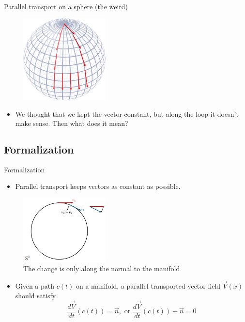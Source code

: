 \documentclass{beamer}
\begin{document}
\begin{frame}{Parallel transport on a sphere (the weird)}
\begin{figure}[h!]
    \includegraphics[width=0.4\textwidth]{images/PT_sphere.png}
\end{figure}  
\begin{itemize}
    \item We thought that we kept the vector constant, but along the loop it doesn't make sense. Then what does it mean?
\end{itemize}  
\end{frame}

\subsection{Formalization}
\begin{frame}{Formalization}
    \begin{itemize}
        \item Parallel transport keeps vectors as constant as possible.
    \end{itemize}
    \begin{figure}[h!]
        \includegraphics[width=0.4\textwidth]{images/only_normal.png}
        \caption{The change is only along the normal to the manifold}
    \end{figure}
    \begin{itemize}
        \item Given a path $c(t)$ on a manifold, a parallel transported vector field $\vec{V}(x)$ should satisfy 
        \begin{equation}
            \frac{d\vec{V}}{dt}(c(t)) = \vec{n}, \text{ or } \frac{d\vec{V}}{dt}(c(t)) - \vec{n} = 0
        \end{equation}
    \end{itemize}
\end{frame}
\end{document}

